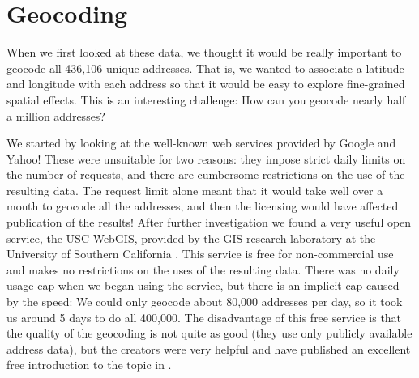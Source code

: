 \documentclass[oneside]{article}
\begin{document}


\section{Geocoding} 

When we first looked at these data, we thought it would be really important to geocode all 436,106 unique addresses.  That is, we wanted to associate a latitude and longitude with each address so that it would be easy to explore fine-grained spatial effects. This is an interesting challenge: How can you geocode nearly half a million addresses? 

We started by looking at the well-known web services provided by Google and Yahoo! These were unsuitable for two reasons: they impose strict daily limits on the number of requests, and there are cumbersome restrictions on the use of the resulting data.  The request limit alone meant that it would take well over a month to geocode all the addresses, and then the licensing would have affected publication of the results! After further investigation we found a very useful open service, the USC WebGIS, provided by the GIS research laboratory at the University of Southern California \citep{uscgis}.  This service is free for non-commercial use and makes no restrictions on the uses of the resulting data.  There was no daily usage cap when we began using the service, but there is an implicit cap caused by the speed: We could only geocode about 80,000 addresses per day, so it took us around 5 days to do all 400,000.  The disadvantage of this free service is that the quality of the geocoding is not quite as good (they use only publicly available address data), but the creators were very helpful and have published an excellent free introduction to the topic in \citet{goldberg:2008}.  
\end{document}
